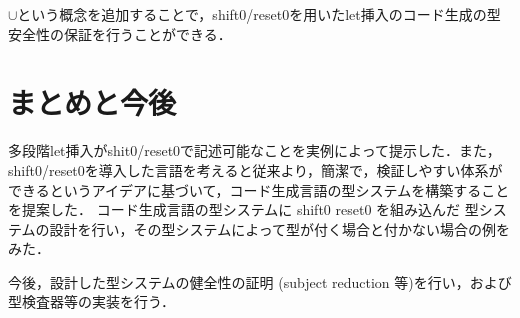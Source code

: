 \documentclass[10pt,a4j,twocolumn]{jarticle}
\theoremstyle{definition}
\begin{document}
$\cup$という概念を追加することで，shift0/reset0を用いたlet挿入のコード生成の型安全性の保証を行うことができる．


\section{まとめと今後}
多段階let挿入がshit0/reset0で記述可能なことを実例によって提示した．また，shift0/reset0を導入した言語を考えると従来より，簡潔で，検証しやすい体系ができるというアイデアに基づいて，コード生成言語の型システムを構築することを提案した．
コード生成言語の型システム\cite{Sudo2014}に shift0 reset0 を組み込んだ 型システムの設計を行い，その型システムによって型が付く場合と付かない場合の例をみた．

今後，設計した型システムの健全性の証明 (subject reduction 等)を行い，および型検査器等の実装を行う．



\end{document}
